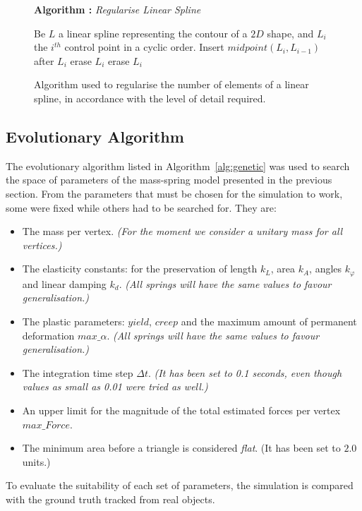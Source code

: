 \documentclass[journal]{IEEEtran}
\newcommand{\alref}[1]{Algorithm~\ref{#1}}
\newcounter{algorithm}
\newenvironment{algorithmicieee}[1]
  {\refstepcounter{algorithm}
   \begin{lrbox}{\ieeealgbox}
   \begin{minipage}{\dimexpr\columnwidth-2\fboxsep-2\fboxrule}
   \textbf{Algorithm \arabic{algorithm}:} \textit{#1} \par
   \begin{algorithmic}[1]}
  {\end{algorithmic}
   \end{minipage}
   \end{lrbox}\noindent\fbox{\usebox{\ieeealgbox}}}
\begin{document}
\begin{figure}
 \begin{algorithmicieee}{Regularise Linear Spline}\label{alg:regularise}
 \STATE Be $L$ a linear spline representing the contour of a $2D$ shape, and $L_i$ the $i^{th}$ control point in a cyclic order.
  \STATE Insert $midpoint(L_i,L_{i-1})$ after $L_i$
  \STATE erase $L_i$
  \STATE erase $L_i$
 \ENDIF
 \ENDFOR
\end{algorithmicieee}
\caption{Algorithm used to regularise the number of elements of a linear spline, in accordance with the level of detail required.}
\end{figure}


\subsection{Evolutionary Algorithm}
The evolutionary algorithm listed in \alref{alg:genetic} was used to search the space of parameters of the mass-spring model presented in the previous section.
From the parameters that must be chosen for the simulation to work, some were fixed while others had to be searched for.  They are:
\begin{itemize}
 \item The mass per vertex.  \textit{(For the moment we consider a unitary mass for all vertices.)}
 \item The elasticity constants: for the preservation of length $k_L$, area $k_A$, angles $k_{\varphi}$ and linear damping $k_d$.  \textit{(All springs will have the same values to favour generalisation.)}
 \item The plastic parameters: $yield$, $creep$ and the maximum amount of permanent deformation $max\_\alpha$.  \textit{(All springs will have the same values to favour generalisation.)}
 \item The integration time step $\Delta t$.  \textit{(It has been set to 0.1 seconds, even though values as small as 0.01 were tried as well.)}
 \item An upper limit for the magnitude of the total estimated forces per vertex $max\_Force$.
 \item The minimum area before a triangle is considered \textit{flat}.  (It has been set to $2.0$ units.)
\end{itemize}
To evaluate the suitability of each set of parameters, the simulation is compared with the ground truth tracked from real objects.
\end{document}
